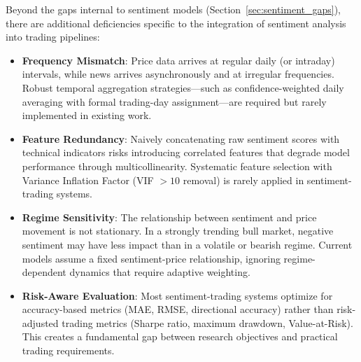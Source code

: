 Beyond the gaps internal to sentiment models (Section~\ref{sec:sentiment_gaps}), there are additional deficiencies specific to the integration of sentiment analysis into trading pipelines:
\begin{itemize}
    \item \textbf{Frequency Mismatch}: Price data arrives at regular daily (or intraday) intervals, while news arrives asynchronously and at irregular frequencies. Robust temporal aggregation strategies---such as confidence-weighted daily averaging with formal trading-day assignment---are required but rarely implemented in existing work.
    
    \item \textbf{Feature Redundancy}: Naively concatenating raw sentiment scores with technical indicators risks introducing correlated features that degrade model performance through multicollinearity. Systematic feature selection with Variance Inflation Factor (VIF $> 10$ removal) is rarely applied in sentiment-trading systems.
    
    \item \textbf{Regime Sensitivity}: The relationship between sentiment and price movement is not stationary. In a strongly trending bull market, negative sentiment may have less impact than in a volatile or bearish regime. Current models assume a fixed sentiment-price relationship, ignoring regime-dependent dynamics that require adaptive weighting.
    
    \item \textbf{Risk-Aware Evaluation}: Most sentiment-trading systems optimize for accuracy-based metrics (MAE, RMSE, directional accuracy) rather than risk-adjusted trading metrics (Sharpe ratio, maximum drawdown, Value-at-Risk). This creates a fundamental gap between research objectives and practical trading requirements.
\end{itemize}

